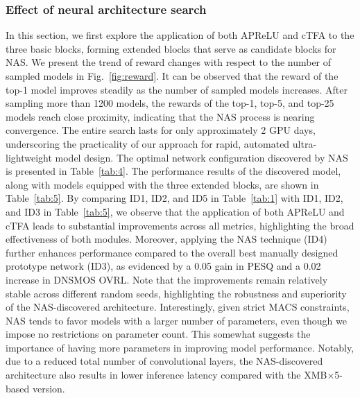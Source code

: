 \documentclass[journal]{IEEEtran}
\newcommand{\rev}[1]{#1}
\newcommand{\rrev}[1]{#1}
\begin{document}
\subsubsection{Effect of neural architecture search}
In this section, we first explore the application of both APReLU and cTFA to the three basic blocks, forming extended blocks that serve as candidate blocks for NAS. We present the trend of reward changes with respect to the number of sampled models in Fig.~\ref{fig:reward}. It can be observed that the reward of the top-1 model improves steadily as the number of sampled models increases. After sampling more than 1200 models, the rewards of the top-1, top-5, and top-25 models reach close proximity, indicating that the NAS process is nearing convergence. The entire search lasts for \rev{only} approximately 2 \rev{GPU} days, \rev{underscoring the practicality of our approach for rapid, automated ultra-lightweight model design.} The optimal network configuration discovered by NAS is presented in Table~\ref{tab:4}. The performance results of the discovered model, along with models equipped with the three extended blocks, are shown in Table~\ref{tab:5}. By comparing ID1, ID2, and ID5 in Table~\ref{tab:1} with ID1, ID2, and ID3 in Table~\ref{tab:5}, we observe that the application of both APReLU and cTFA leads to substantial improvements across all metrics, highlighting the broad effectiveness of both modules. Moreover, \rrev{applying} the NAS technique \rrev{(ID4)} further enhances performance compared to the overall best manually designed prototype network (ID3)\rrev{, as evidenced by a 0.05 gain in PESQ and a 0.02 increase in DNSMOS OVRL. Note that the improvements remain relatively stable across different random seeds, highlighting the robustness and superiority of the NAS-discovered architecture}. Interestingly, \rrev{given strict MACS constraints}, NAS tends to favor models with a larger number of parameters, even though we impose no restrictions on parameter count. This somewhat suggests the importance of having more parameters in improving model performance. Notably, due to a reduced total number of \rev{convolutional} layers, the NAS-discovered architecture also results in lower inference latency \rev{compared with the XMB$\times$5-based version}.
\end{document}
